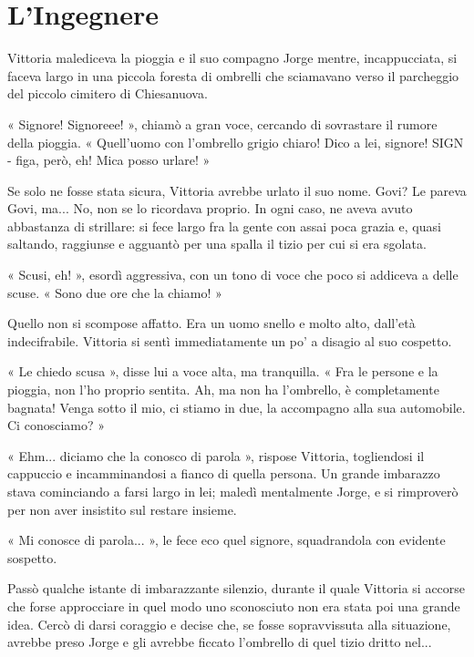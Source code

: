 \chapter{L'Ingegnere}


Vittoria malediceva la pioggia e il suo compagno Jorge mentre, incappucciata, si faceva largo in una piccola foresta di ombrelli che sciamavano verso il parcheggio del piccolo cimitero di Chiesanuova.

« Signore! Signoreee! », chiamò a gran voce, cercando di sovrastare il rumore della pioggia. « Quell'uomo con l'ombrello grigio chiaro! Dico a lei, signore! SIGN - figa, però, eh! Mica posso urlare! »

Se solo ne fosse stata sicura, Vittoria avrebbe urlato il suo nome. Govi? Le pareva Govi, ma... No, non se lo ricordava proprio. In ogni caso, ne aveva avuto abbastanza di strillare: si fece largo fra la gente con assai poca grazia e, quasi saltando, raggiunse e agguantò per una spalla il tizio per cui si era sgolata.

« Scusi, eh! », esordì aggressiva, con un tono di voce che poco si addiceva a delle scuse. « Sono due ore che la chiamo! »

Quello non si scompose affatto. Era un uomo snello e molto alto, dall'età indecifrabile. Vittoria si sentì immediatamente un po' a disagio al suo cospetto.

« Le chiedo scusa », disse lui a voce alta, ma tranquilla. « Fra le persone e la pioggia, non l'ho proprio sentita. Ah, ma non ha l'ombrello, è completamente bagnata! Venga sotto il mio, ci stiamo in due, la accompagno alla sua automobile. Ci conosciamo? »

« Ehm... diciamo che la conosco di parola », rispose Vittoria, togliendosi il cappuccio e incamminandosi a fianco di quella persona. Un grande imbarazzo stava cominciando a farsi largo in lei; maledì mentalmente Jorge, e si rimproverò per non aver insistito sul restare insieme.

« Mi conosce di parola... », le fece eco quel signore, squadrandola con evidente sospetto.

Passò qualche istante di imbarazzante silenzio, durante il quale Vittoria si accorse che forse approcciare in quel modo uno sconosciuto non era stata poi una grande idea. Cercò di darsi coraggio e decise che, se fosse sopravvissuta alla situazione, avrebbe preso Jorge e gli avrebbe ficcato l'ombrello di quel tizio dritto nel...

